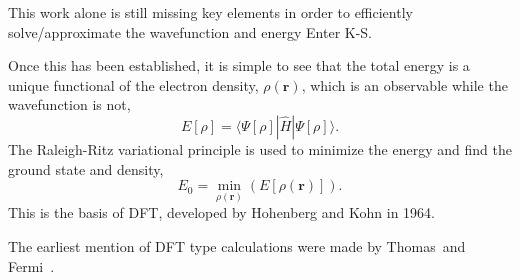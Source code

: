 This work alone is still missing key elements in order to efficiently solve/approximate the wavefunction and energy \expand Enter K-S.


Once this has been established, it is simple to see that the total energy is a unique functional of the electron density, $\rho(\textbf{r})$, which is an observable while the wavefunction is not,
\begin{equation}
\label{eq:H-KenergyDensity}
 E[\rho] = \langle \Psi[\rho] | \widehat{H} | \Psi[\rho] \rangle.
\end{equation}
The Raleigh-Ritz variational principle is used to minimize the energy and find the ground state and density, %
\begin{equation}
 E_{0} = \min_{\rho(\mathbf{r})} \left(E[\rho(\mathbf{r})] \right).
\label{eq:H-Kvariational}
\end{equation}
This is the basis of DFT, developed by Hohenberg and Kohn \cite{hohenberg1964} in 1964.

\bit
\item The earliest mention of DFT type calculations were made by Thomas~\citemiss and Fermi~\citemiss.
\eit

